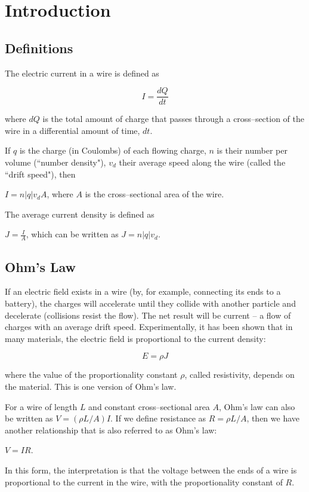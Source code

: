 \documentclass{article}
\newcommand{\ds}[0]{\displaystyle}
\begin{document}
\section{Introduction}

\subsection{Definitions}

The electric current in a wire is defined as 

$$I = \frac{dQ}{dt}$$

where $dQ$ is the total amount of charge that passes through a cross--section of the wire in a differential amount of time, $dt$.

If $q$ is the charge (in Coulombs) of each flowing charge, $n$ is their number per volume (``number density"), $v_d$ their average speed along the wire (called the ``drift speed"), then

$I = n|q|v_dA$, where $A$ is the cross--sectional area of the wire.

The average current density is defined as

$\ds J=\frac{I}{A}$, which can be written as $J = n|q|v_d$.

\subsection{Ohm's Law}

If an electric field exists in a wire (by, for example, connecting its ends to a battery), the charges will accelerate until they collide with another particle and decelerate (collisions resist the flow). The net result will be current -- a flow of charges with an average drift speed. Experimentally, it has been shown that in many materials, the electric field is proportional to the current density: 

$$E = \rho J$$

where the value of the proportionality constant $\rho$, called resistivity, depends on the material. This is one version of Ohm's law.

For a wire of length $L$ and constant cross--sectional area $A$, Ohm's law can also be written as $V = ({\rho L}/{A}) I$. If we define resistance as $R = {\rho L}/{A}$, then we have another relationship that is also referred to as Ohm's law: 

$V = I R$.

In this form, the interpretation is that the voltage between the ends of a wire is proportional to the current in the wire, with the proportionality constant of $R$.
\end{document}
